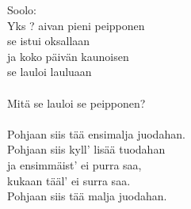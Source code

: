 
Soolo: \\ Yks ? aivan pieni peipponen \\ se istui oksallaan \\ ja koko päivän kaunoisen \\ se lauloi lauluaan \\ \hspace{10mm} \\ Mitä se lauloi se peipponen? \\ \hspace{10mm} \\ Pohjaan siis tää ensimalja juodahan. \\ Pohjaan siis kyll' lisää tuodahan \\ ja ensimmäist' ei purra saa, \\ kukaan tääl' ei surra saa. \\ Pohjaan siis tää malja juodahan.
